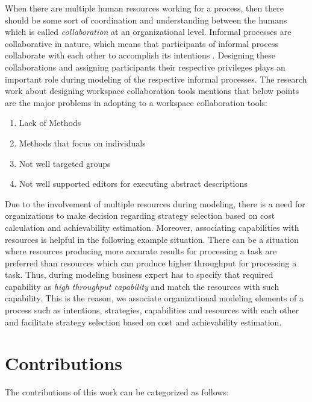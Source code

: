 When there are multiple human resources working for a process, then there should be some sort of coordination and understanding between the humans which is called \textit{collaboration} at an organizational level. Informal processes are collaborative in nature, which means that participants of informal process collaborate with each other to accomplish its intentions \cite{Sungur2015}. Designing these collaborations and assigning participants their respective privileges plays an important role during modeling of the respective informal processes. The research work about designing workspace collaboration tools \cite{Matthews2011} mentions that below points are the major problems in adopting to a workspace collaboration tools:

\begin{enumerate}
	\item Lack of Methods
	\item Methods that focus on individuals
	\item Not well targeted groups
	\item Not well supported editors for executing abstract descriptions
\end{enumerate}

Due to the involvement of multiple resources during modeling, there is a need for organizations to make decision regarding strategy selection based on cost calculation and achievability estimation.  Moreover, associating capabilities with resources is helpful in the following example situation. There can be a situation where resources producing more accurate results for processing a task are preferred than resources which can produce higher throughput for processing a task. Thus, during modeling business expert has to specify that required capability as \textit{high throughput capability} and match the resources with such capability. This is the reason, we associate organizational modeling elements of a process such as intentions, strategies, capabilities and resources with each other and facilitate strategy selection based on cost and achievability estimation. 

\section {Contributions}
\label{sec:researchobjectives}
The contributions of this work can be categorized as follows:


